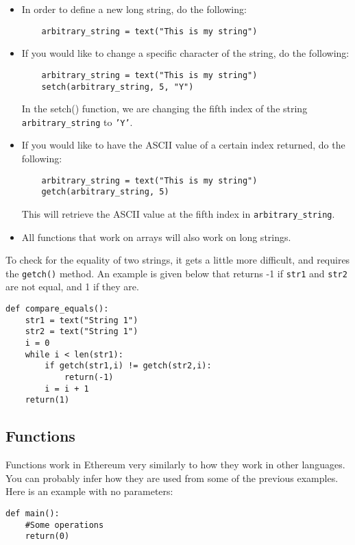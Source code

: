 \documentclass[12pt]{article}
\begin{document}
\begin{itemize}
\item In order to define a new long string, do the following:
	\begin{verbatim}
	arbitrary_string = text("This is my string")
	\end{verbatim}
\item If you would like to change a specific character of the string, do the following:
	\begin{verbatim}
	arbitrary_string = text("This is my string")
	setch(arbitrary_string, 5, "Y")
	\end{verbatim}
	In the setch() function, we are changing the fifth index of the string \texttt{arbitrary\_string} to \texttt{'Y'}.
\item If you would like to have the ASCII value of a certain index returned, do the following:
	\begin{verbatim}
	arbitrary_string = text("This is my string")
	getch(arbitrary_string, 5)
	\end{verbatim}
	This will retrieve the ASCII value at the fifth index in \texttt{arbitrary\_string}.
\item All functions that work on arrays will also work on long strings.
\end{itemize} \cite{Serpent,Serpent1.0(old)}

To check for the equality of two strings, it gets a little more difficult, and requires the \texttt{getch()} method. An example is given below that returns -1 if \texttt{str1} and \texttt{str2} are not equal, and 1 if they are.

\begin{verbatim}
def compare_equals():
	str1 = text("String 1")
	str2 = text("String 1")
	i = 0
	while i < len(str1):
		if getch(str1,i) != getch(str2,i):
			return(-1)
		i = i + 1
	return(1)
\end{verbatim}
	
\subsection{Functions}
Functions work in Ethereum very similarly to how they work in other languages. You can probably infer how they are used from some of the previous examples. Here is an example with no parameters:

\begin{verbatim}
def main():
	#Some operations
	return(0)
\end{verbatim}
\end{document}
